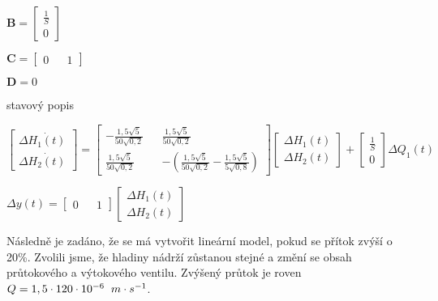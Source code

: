 \documentclass{article}
\begin{document}
\begin{center}
			\bigskip
			
			$\textbf{B}=\begin{bmatrix}
 			\frac{1}{S}\\
			0
			\end{bmatrix}$
			
			\bigskip
			
			$\textbf{C}=\begin{bmatrix}
			0 && 1
			\end{bmatrix}$
			
			\bigskip
			
			$\textbf{D}=0$
			
			\bigskip
			
			stavový popis
			
			\bigskip
			
			$\begin{bmatrix}
			\Delta \dot{H_1(t)}\\
			\Delta \dot{H_2(t)}
			\end{bmatrix}=\begin{bmatrix}
			-\frac{1,5\sqrt{5}}{50\sqrt{0,2}} && \frac{1,5\sqrt{5}}{50\sqrt{0,2}}\\
			\frac{1,5\sqrt{5}}{50\sqrt{0,2}}&& -\left(\frac{1,5\sqrt{5}}{50\sqrt{0,2}}-\frac{1,5\sqrt{5}}{5\sqrt{0,8}}\right)
			\end{bmatrix}\begin{bmatrix}
			\Delta H_1(t)\\
			\Delta H_2(t)
			\end{bmatrix}+\begin{bmatrix}
			\frac{1}{S}\\
			0
			\end{bmatrix}\Delta Q_1(t)$
			
			\bigskip
			
			$\Delta y(t)=\begin{bmatrix}
			0 && 1
			\end{bmatrix}\begin{bmatrix}
			\Delta H_1(t)\\
			\Delta H_2(t)
			\end{bmatrix}$
			\end{center} 
			
			Následně je zadáno, že se má vytvořit lineární model, pokud se přítok zvýší o 20\%. Zvolili jsme, že hladiny nádrží zůstanou stejné a změní se obsah průtokového a výtokového ventilu. Zvýšený průtok je roven $Q=1,5 \cdot 120 \cdot 10^{-6} \hspace{2mm} m \cdot s^{-1}$. 
			
\end{document}
